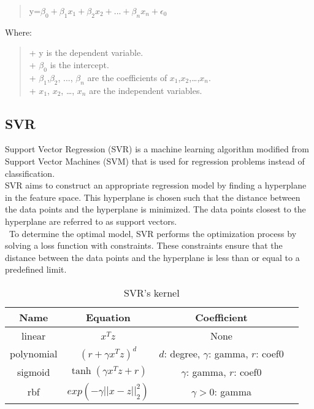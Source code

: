 \documentclass{ieeeojies}
\begin{document}
\begin{quote}
y=$\beta_0 + \beta_1x_1 + \beta_2x_2 + ... + \beta_nx_n + \epsilon_0$
\end{quote}
Where:
\begin{quote}
    + y is the dependent variable.\\
    + $\beta_0$ is the intercept. \\
    + $\beta_1$,$\beta_2$, ..., $\beta_n$ are the coefficients of $x_1$,$x_2$,…,$x_n$.\\
    + $x_1$, $x_2$, …, $x_n$ are the independent variables.
\end{quote}


\subsection{SVR}
Support Vector Regression (SVR) is a machine learning algorithm modified from Support Vector Machines (SVM) that is used for regression problems instead of classification.\\
SVR aims to construct an appropriate regression model by finding a hyperplane in the feature space. This hyperplane is chosen such that the distance between the data points and the hyperplane is minimized. The data points closest to the hyperplane are referred to as support vectors.\\\
To determine the optimal model, SVR performs the optimization process by solving a loss function with constraints. These constraints ensure that the distance between the data points and the hyperplane is less than or equal to a predefined limit. 
\begin{table}[H]
    \centering
\begin{tabular}{|c|c|c|c|}
\hline
Name & Equation & Coefficient \\
\hline
linear & $x^Tz$ &  None\\
\hline
\centering polynomial & $(r + \gamma x^Tz)^d$  & \parbox{1.6cm}{\centering $d$: degree,\\ $\gamma$: gamma,\\ $r$: coef0} \\
\hline
sigmoid & \centering $\tanh(\gamma x^Tz + r)$ & \parbox{3cm}{\centering $\gamma$: gamma, \\ $r$: coef0} \\
\hline
rbf & $exp(-\gamma||x - z||_2^2)$ &$\gamma>0$: gamma \\
\hline
\end{tabular}
    \caption{SVR's kernel}
    \label{SVRkernel}
\end{table}
\end{document}

